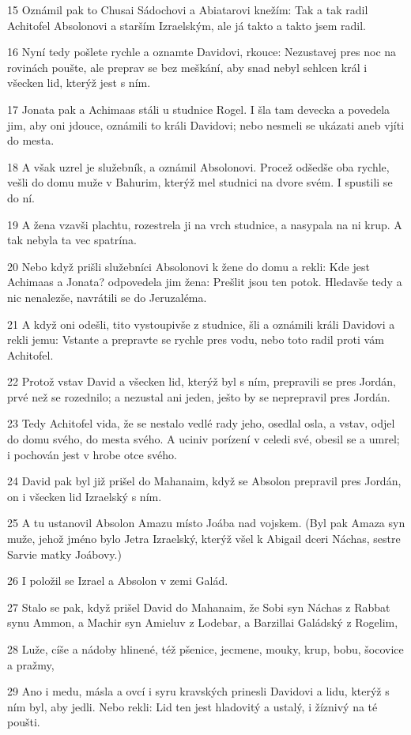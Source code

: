 \par 15 Oznámil pak to Chusai Sádochovi a Abiatarovi knežím: Tak a tak radil Achitofel Absolonovi a starším Izraelským, ale já takto a takto jsem radil.
\par 16 Nyní tedy pošlete rychle a oznamte Davidovi, rkouce: Nezustavej pres noc na rovinách poušte, ale preprav se bez meškání, aby snad nebyl sehlcen král i všecken lid, kterýž jest s ním.
\par 17 Jonata pak a Achimaas stáli u studnice Rogel. I šla tam devecka a povedela jim, aby oni jdouce, oznámili to králi Davidovi; nebo nesmeli se ukázati aneb vjíti do mesta.
\par 18 A však uzrel je služebník, a oznámil Absolonovi. Procež odšedše oba rychle, vešli do domu muže v Bahurim, kterýž mel studnici na dvore svém. I spustili se do ní.
\par 19 A žena vzavši plachtu, rozestrela ji na vrch studnice, a nasypala na ni krup. A tak nebyla ta vec spatrína.
\par 20 Nebo když prišli služebníci Absolonovi k žene do domu a rekli: Kde jest Achimaas a Jonata? odpovedela jim žena: Prešlit jsou ten potok. Hledavše tedy a nic nenalezše, navrátili se do Jeruzaléma.
\par 21 A když oni odešli, tito vystoupivše z studnice, šli a oznámili králi Davidovi a rekli jemu: Vstante a prepravte se rychle pres vodu, nebo toto radil proti vám Achitofel.
\par 22 Protož vstav David a všecken lid, kterýž byl s ním, prepravili se pres Jordán, prvé než se rozednilo; a nezustal ani jeden, ješto by se neprepravil pres Jordán.
\par 23 Tedy Achitofel vida, že se nestalo vedlé rady jeho, osedlal osla, a vstav, odjel do domu svého, do mesta svého. A uciniv porízení v celedi své, obesil se a umrel; i pochován jest v hrobe otce svého.
\par 24 David pak byl již prišel do Mahanaim, když se Absolon prepravil pres Jordán, on i všecken lid Izraelský s ním.
\par 25 A tu ustanovil Absolon Amazu místo Joába nad vojskem. (Byl pak Amaza syn muže, jehož jméno bylo Jetra Izraelský, kterýž všel k Abigail dceri Náchas, sestre Sarvie matky Joábovy.)
\par 26 I položil se Izrael a Absolon v zemi Galád.
\par 27 Stalo se pak, když prišel David do Mahanaim, že Sobi syn Náchas z Rabbat synu Ammon, a Machir syn Amieluv z Lodebar, a Barzillai Galádský z Rogelim,
\par 28 Luže, cíše a nádoby hlinené, též pšenice, jecmene, mouky, krup, bobu, šocovice a pražmy,
\par 29 Ano i medu, másla a ovcí i syru kravských prinesli Davidovi a lidu, kterýž s ním byl, aby jedli. Nebo rekli: Lid ten jest hladovitý a ustalý, i žíznivý na té poušti.


